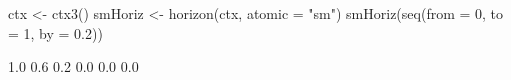 \begin{Schunk}
% --begin: "horizon"
\begin{Sinput}
 ctx <- ctx3()
 smHoriz <- horizon(ctx, atomic = "sm")
 smHoriz(seq(from = 0, to = 1, by = 0.2))
\end{Sinput}
\begin{Soutput}
[1] 1.0 0.6 0.2 0.0 0.0 0.0
\end{Soutput}
%
% --end: "horizon"
\end{Schunk}
